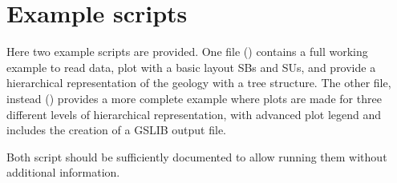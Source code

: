 \documentclass[letterpaper,10pt,english]{sphinxmanual}
\begin{document}
\section{Example scripts}
\label{\detokenize{usage:example-scripts}}
Here two example scripts are provided. One file
() contains a full working example to read
data, plot with a basic layout SBs and SUs, and provide a hierarchical
representation of the geology with a tree structure. The other file,
instead () provides a more complete example where
plots are made for three different levels of hierarchical
representation, with advanced plot legend and includes the creation of
a GSLIB output file.

Both script should be sufficiently documented to allow running them
without additional information.
\end{document}
